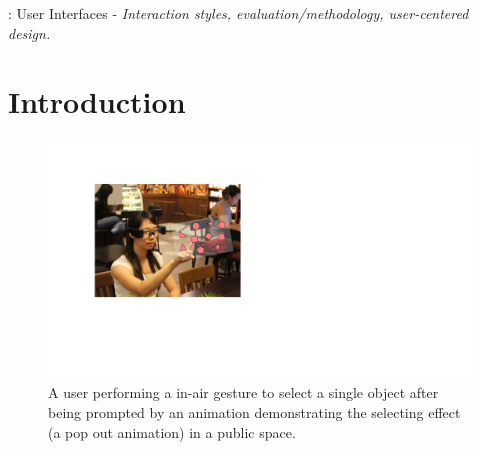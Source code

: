 \documentclass{sigchi}
\begin{document}
: User Interfaces - \emph{Interaction styles, evaluation/methodology, user-centered design.}



\section{Introduction}

 \begin{figure}[!h]
  \centering
  \includegraphics[width=1\columnwidth]{TopFigure.pdf}
  \caption{A user performing a in-air gesture to select a single object after being prompted by an animation demonstrating the selecting effect (a pop out animation) in a public space.}
  \label{fig:TopFigure}
  \end{figure} 
\end{document}
